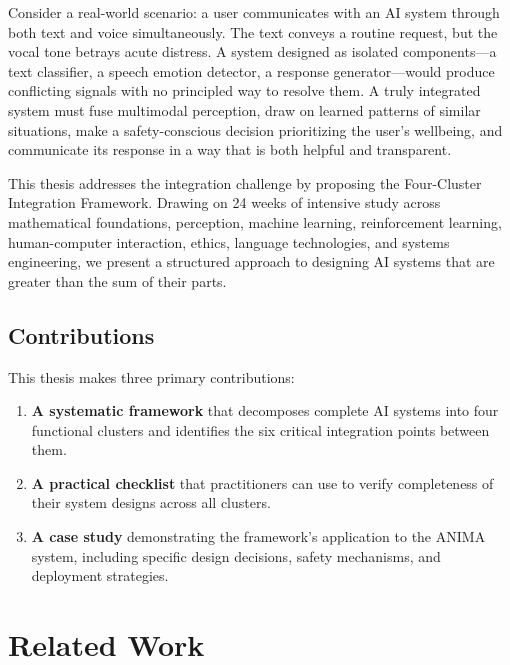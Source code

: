 \documentclass[11pt,a4paper]{article}
\begin{document}
Consider a real-world scenario: a user communicates with an AI system through both text and voice simultaneously. The text conveys a routine request, but the vocal tone betrays acute distress. A system designed as isolated components---a text classifier, a speech emotion detector, a response generator---would produce conflicting signals with no principled way to resolve them. A truly integrated system must fuse multimodal perception, draw on learned patterns of similar situations, make a safety-conscious decision prioritizing the user's wellbeing, and communicate its response in a way that is both helpful and transparent.

This thesis addresses the integration challenge by proposing the Four-Cluster Integration Framework. Drawing on 24 weeks of intensive study across mathematical foundations, perception, machine learning, reinforcement learning, human-computer interaction, ethics, language technologies, and systems engineering, we present a structured approach to designing AI systems that are greater than the sum of their parts.

\subsection{Contributions}

This thesis makes three primary contributions:

\begin{enumerate}
  \item \textbf{A systematic framework} that decomposes complete AI systems into four functional clusters and identifies the six critical integration points between them.

  \item \textbf{A practical checklist} that practitioners can use to verify completeness of their system designs across all clusters.

  \item \textbf{A case study} demonstrating the framework's application to the ANIMA system, including specific design decisions, safety mechanisms, and deployment strategies.
\end{enumerate}

\section{Related Work}
\end{document}
